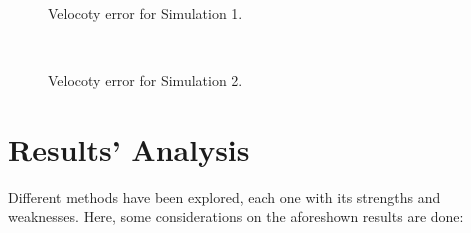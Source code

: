 \documentclass[a4paper,12pt,oneside]{report}
\begin{document}
\begin{figure}[h]
  \centering
  \subfloat{} \quad
  \subfloat{}\\
  \caption{Velocoty error for Simulation 1.}
  \label{velocity_1}
\end{figure}
\begin{figure}[h]
  \centering
  \subfloat{} \quad
  \subfloat{}\\
  \caption{Velocoty error for Simulation 2.}
  \label{velocity_2}
\end{figure}
\section{Results' Analysis}
Different methods have been explored, each one with its strengths and weaknesses. Here, some considerations on the aforeshown results are done:
\end{document}

